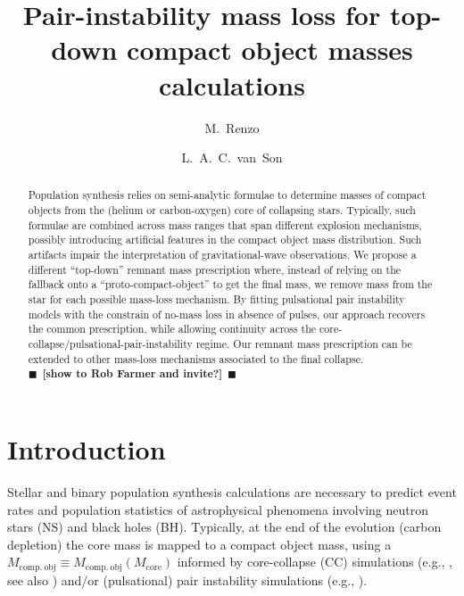 \documentclass[twocolumn]{aastex63}
\newcommand{\todo}[1]{{\large $\blacksquare$~\textbf{\color{red}[#1]}}~$\blacksquare$}
\begin{document}
\title{Pair-instability mass loss for top-down compact object masses calculations}

\author[0000-0002-6718-9472]{M.~Renzo}


\author[0000-0001-5484-4987]{L.~A.~C.~van~Son}


\begin{abstract}
  Population synthesis relies on semi-analytic formulae to determine
  masses of compact objects from the (helium or carbon-oxygen) core of
  collapsing stars. Typically, such formulae are combined across mass
  ranges that span different explosion mechanisms, possibly
  introducing artificial features in the compact object mass
  distribution. Such artifacts impair the interpretation of
  gravitational-wave observations. We propose a different ``top-down''
  remnant mass prescription where, instead of relying on the fallback
  onto a ``proto-compact-object'' to get the final mass, we remove
  mass from the star for each possible mass-loss mechanism. By fitting
  pulsational pair instability models with the constrain of no-mass
  loss in absence of pulses, our approach recovers the common
  prescription, while allowing continuity across the
  core-collapse/pulsational-pair-instability regime. Our remnant mass prescription can be
  extended
  to other mass-loss mechanisms associated to the final collapse.
  \\

  \todo{show to Rob Farmer and invite?}
\end{abstract}

\section{Introduction}

Stellar and binary population synthesis calculations are necessary to
predict event rates and population statistics of astrophysical
phenomena involving neutron stars (NS) and
black holes (BH). Typically, at the end of the evolution (carbon
depletion) the core mass is mapped to a compact object mass, using a
$M_\mathrm{comp.\ obj}\equiv M_\mathrm{comp.\ obj}(M_\mathrm{core})$
informed by core-collapse (CC) simulations (e.g., \citealt{fryer:12,
  spera:15, mandel:20, couch:20}, see also \citealt{zapartas:21, patton:21}) and/or (pulsational) pair instability simulations
(e.g., \citealt{belczynski:16, woosley:17, spera:17, stevenson:19,
  marchant:19, farmer:19, costa:21}).
\end{document}
